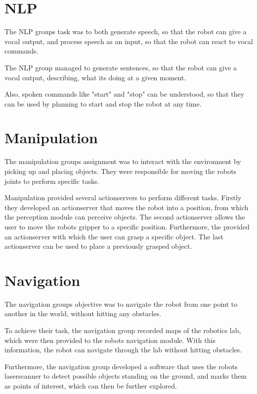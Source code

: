 \documentclass[main.tex]{subfiles}
\begin{document}
		\section{NLP}
		The NLP groups task was to both generate speech, so that the robot can give a vocal output, and process speech as an input, so that the robot can react to vocal commands.
		
		The NLP group managed to generate sentences, so that the robot can give a vocal output, describing, what its doing at a given moment.
		
		Also, spoken commands like "start" and "stop" can be understood, so that they can be used by planning to start and stop the robot at any time.
		
		\section{Manipulation}
		The manipulation groups assignment was to interact with the environment by picking up and placing objects. They were responsible for moving the robots joints to perform specific tasks.
		
		Manipulation provided several actionservers to perform different tasks. Firstly they developed an actionserver that moves the robot into a position, from which the perception module can perceive objects. The second actionserver allows the user to move the robots gripper to a specific position. Furthermore, the provided an actionserver with which the user can grasp a specific object. The last actionserver can be used to place a previously grasped object.
		
		\section{Navigation}	  	
		The navigation groups objective was to navigate the robot from one point to another in the world, without hitting any obstacles.
		
		To achieve their task, the navigation group recorded maps of the robotics lab, which were then provided to the robots navigation module. With this information, the robot can navigate through the lab without hitting obstacles.
		
		Furthermore, the navigation group developed a software that uses the robots laserscanner to detect possible objects standing on the ground, and marks them as points of interest, which can then be further explored.

		
	\endgroup
\end{document}
